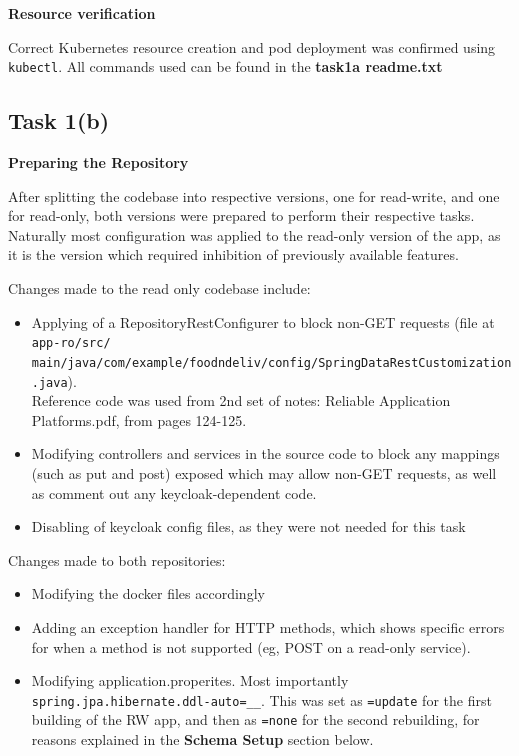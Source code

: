 \documentclass[11pt,a4paper]{article}
\begin{document}
	\textbf{Resource verification}
	
	Correct Kubernetes resource creation and pod deployment was confirmed using \texttt{kubectl}. All commands used can be found in the \textbf{task1a readme.txt}
	
	\subsection{Task 1(b)}
	
	\textbf{Preparing the Repository}
	
	After splitting the codebase into respective versions, one for read-write, and one for read-only, both versions were prepared to perform their respective tasks. Naturally most configuration was applied to the read-only version of the app, as it is the version which required inhibition of previously available features. 
	
	Changes made to the read only codebase include:
	\begin{itemize}
		\item Applying of a RepositoryRestConfigurer to block non-GET requests (file at \texttt{app-ro/src/}\\\texttt{main/java/com/example/foodndeliv/config/SpringDataRestCustomization.java}). \\ Reference code was used from 2nd set of notes: Reliable Application Platforms.pdf, from pages 124-125.
		
		\item Modifying controllers and services in the source code to block any mappings (such as put and post) exposed which may allow non-GET requests, as well as comment out any keycloak-dependent code.
		
		\item Disabling of keycloak config files, as they were not needed for this task
		
	\end{itemize}
	
	Changes made to both repositories:
	\begin{itemize}
		\item Modifying the docker files accordingly
		
		\item Adding an exception handler for HTTP methods, which shows specific errors for when a method is not supported (eg, POST on a read-only service).
		
		\item Modifying application.properites. Most importantly \texttt{spring.jpa.hibernate.ddl-auto=\_\_}. This was set as \texttt{=update} for the first building of the RW app, and then as \texttt{=none} for the second rebuilding, for reasons explained in the \textbf{Schema Setup} section below.
	\end{itemize}
	
\end{document}
